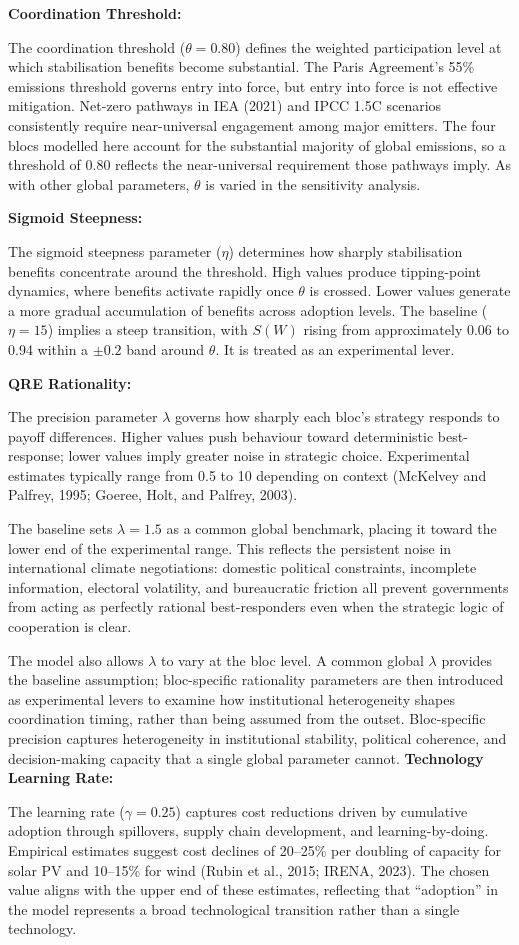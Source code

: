 \documentclass[10pt,a4paper]{article}
\newcommand{\bpar}[1]{\medskip\noindent\textbf{#1}\par}
\begin{document}
\bpar{Coordination Threshold:}
The coordination threshold ($\theta = 0.80$) defines the weighted participation level at which stabilisation
benefits become substantial. The Paris Agreement's 55\% emissions threshold governs entry into force, but
entry into force is not effective mitigation. Net-zero pathways in IEA (2021) and IPCC 1.5\textdegree C scenarios
consistently require near-universal engagement among major emitters. The four blocs modelled here
account for the substantial majority of global emissions, so a threshold of 0.80 reflects the near-universal
requirement those pathways imply. As with other global parameters, $\theta$ is varied in the sensitivity analysis.

\bpar{Sigmoid Steepness:}
The sigmoid steepness parameter ($\eta$) determines how sharply stabilisation benefits concentrate around the
threshold. High values produce tipping-point dynamics, where benefits activate rapidly once $\theta$ is
crossed. Lower values generate a more gradual accumulation of benefits across adoption levels. The
baseline ($\eta = 15$) implies a steep transition, with $S(W)$ rising from approximately 0.06 to 0.94 within
a $\pm 0.2$ band around $\theta$. It is treated as an experimental lever.

\needspace{5em}
\bpar{QRE Rationality:}
The precision parameter $\lambda$ governs how sharply each bloc's strategy responds to payoff differences.
Higher values push behaviour toward deterministic best-response; lower values imply greater noise in
strategic choice. Experimental estimates typically range from 0.5 to 10 depending on context (McKelvey
and Palfrey, 1995; Goeree, Holt, and Palfrey, 2003).

The baseline sets $\lambda = 1.5$ as a common global benchmark, placing it toward the lower end of the
experimental range. This reflects the persistent noise in international climate negotiations: domestic
political constraints, incomplete information, electoral volatility, and bureaucratic friction all prevent
governments from acting as perfectly rational best-responders even when the strategic logic of
cooperation is clear.

The model also allows $\lambda$ to vary at the bloc level. A common global $\lambda$ provides the
baseline assumption; bloc-specific rationality parameters are then introduced as experimental levers
to examine how institutional heterogeneity shapes coordination timing, rather than being assumed from
the outset. Bloc-specific precision captures heterogeneity in institutional stability, political coherence,
and decision-making capacity that a single global parameter cannot. 
\bpar{Technology Learning Rate:}
The learning rate ($\gamma = 0.25$) captures cost reductions driven by cumulative adoption through spillovers,
supply chain development, and learning-by-doing. Empirical estimates suggest cost declines of 20--25\%
per doubling of capacity for solar PV and 10--15\% for wind (Rubin et al., 2015; IRENA, 2023). The
chosen value aligns with the upper end of these estimates, reflecting that ``adoption'' in the model
represents a broad technological transition rather than a single technology.
\end{document}
